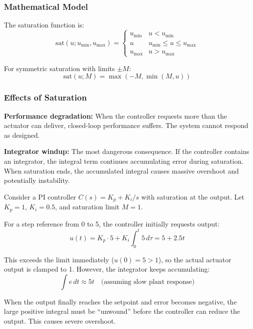 \subsubsection{Mathematical Model}

The saturation function is:
\begin{equation}
\text{sat}(u; u_{\min}, u_{\max}) = \begin{cases}
u_{\min} & u < u_{\min} \\
u & u_{\min} \leq u \leq u_{\max} \\
u_{\max} & u > u_{\max}
\end{cases}
\label{eq:saturation_model}
\end{equation}

For symmetric saturation with limits $\pm M$:
\begin{equation}
\text{sat}(u; M) = \max(-M, \min(M, u))
\end{equation}

\subsubsection{Effects of Saturation}

\textbf{Performance degradation:} When the controller requests more than the actuator can deliver, closed-loop performance suffers. The system cannot respond as designed.

\textbf{Integrator windup:} The most dangerous consequence. If the controller contains an integrator, the integral term continues accumulating error during saturation. When saturation ends, the accumulated integral causes massive overshoot and potentially instability.

\begin{example}
\label{ex:integrator_windup}
Consider a PI controller $C(s) = K_p + K_i/s$ with saturation at the output. Let $K_p = 1$, $K_i = 0.5$, and saturation limit $M = 1$.

For a step reference from 0 to 5, the controller initially requests output:
\begin{equation}
u(t) = K_p \cdot 5 + K_i \int_0^t 5 \, d\tau = 5 + 2.5t
\end{equation}

This exceeds the limit immediately ($u(0) = 5 > 1$), so the actual actuator output is clamped to 1. However, the integrator keeps accumulating:
\begin{equation}
\int e \, dt \approx 5t \quad \text{(assuming slow plant response)}
\end{equation}

When the output finally reaches the setpoint and error becomes negative, the large positive integral must be ``unwound'' before the controller can reduce the output. This causes severe overshoot.
\end{example}


